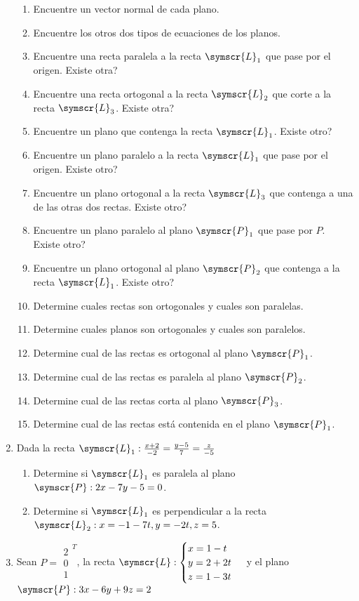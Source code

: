 \documentclass{article}
\def\fancyL{\symscr{L}}
\def\fancyP{\symscr{P}}
\begin{document}
\begin{enumerate}
\begin{enumerate}[label=\listAlph]
		\item Encuentre un vector normal de cada plano.
		\item Encuentre los otros dos tipos de ecuaciones de los planos.
        \item Encuentre una recta paralela a la recta \(\fancyL_1\) que pase por el origen. Existe otra?
        \item Encuentre una recta ortogonal a la recta \(\fancyL_2\) que corte a la recta \(\fancyL_3\). Existe otra?
        \item Encuentre un plano que contenga la recta \(\fancyL_1\). Existe otro?
        \item Encuentre un plano paralelo a la recta \(\fancyL_1\) que pase por el origen. Existe otro?
        \item Encuentre un plano ortogonal a la recta \(\fancyL_3\) que contenga a una de las otras dos rectas. Existe otro?
		\item Encuentre un plano paralelo al plano \(\fancyP_1\) que pase por \(P\). Existe otro?
		\item Encuentre un plano ortogonal al plano \(\fancyP_2\) que contenga a la recta \(\fancyL_1\). Existe otro?
		\item Determine cuales rectas son ortogonales y cuales son paralelas.
		\item Determine cuales planos son ortogonales y cuales son paralelos.
		\item Determine cual de las rectas es ortogonal al plano \(\fancyP_1\).
		\item Determine cual de las rectas es paralela al plano \(\fancyP_2\).
		\item Determine cual de las rectas corta al plano \(\fancyP_3\).
		\item Determine cual de las rectas está contenida en el plano \(\fancyP_1\).
    \end{enumerate}
\setcounter{enumi}{17}
\item Dada la recta \(\fancyL_1: \frac{x + 2}{-2} = \frac{y - 5}{7} = \frac{z}{-5}\)
    \begin{enumerate}[label=\listAlph]
        \item Determine si \(\fancyL_1\) es paralela al plano \(\fancyP: 2x - 7y - 5 = 0\).
        \item Determine si \(\fancyL_1\) es perpendicular a la recta \(\fancyL_2: x = -1 -7t, y = -2t, z = 5\).
    \end{enumerate}
\item Sean \(P = \begin{smallmatrix}2 \\ 0 \\ 1\end{smallmatrix}^T\), la recta \(\fancyL: \begin{cases}x = 1 -t \\ y = 2 + 2t \\ z = 1 - 3t\end{cases}\) y el plano \(\fancyP: 3x -6y + 9z = 2\)

\end{enumerate}
\end{document}
